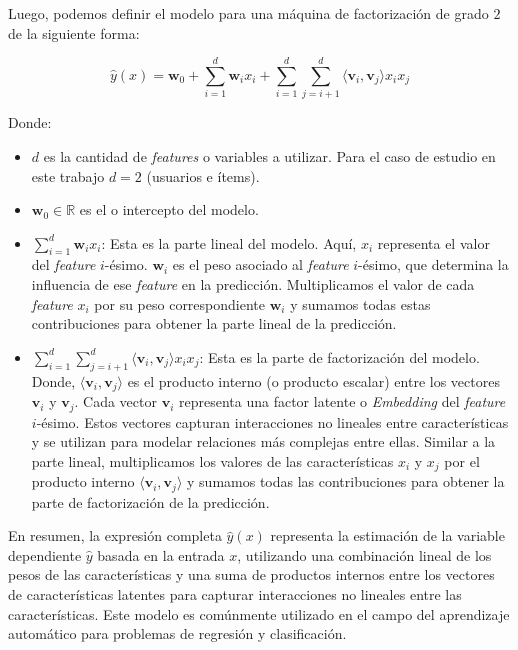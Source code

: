 \documentclass[11pt,a4paper,twoside]{thesis}
\begin{document}
Luego, podemos definir el modelo para una máquina de factorización de grado $2$
de la siguiente forma:

\begin{equation}
	\hat{y}(x) = \mathbf{w}_0 + \sum_{i=1}^d \mathbf{w}_i x_i + \sum_{i=1}^d\sum_{j=i+1}^d
	\langle\mathbf{v}_i, \mathbf{v}_j\rangle x_i x_j
\end{equation}
\begin{description}
	\item[Donde:]
\end{description}
\begin{itemize}
	\item $d$ es la cantidad de \textit{features} o variables a utilizar.
	      Para el caso de estudio en este trabajo $d=2$ (usuarios e ítems).
	\item $\mathbf{w}_0 \in \mathbb{R}$ es el  o intercepto del modelo.
	\item $\sum_{i=1}^d \mathbf{w}_i x_i$: Esta es la parte lineal del modelo. Aquí,
	      $x_i$ representa el valor del \textit{feature} $i$-ésimo. $\mathbf{w}_i$ es
	      el peso asociado al \textit{feature} $i$-ésimo, que determina la influencia
	      de ese \textit{feature} en la predicción. Multiplicamos el valor de cada
	      \textit{feature} $x_i$ por su peso correspondiente $\mathbf{w}_i$ y sumamos
	      todas estas contribuciones para obtener la parte lineal de la predicción.
	\item $\sum_{i=1}^d\sum_{j=i+1}^d \langle\mathbf{v}_i, \mathbf{v}_j\rangle x_i x_j$:
	      Esta es la parte de factorización del modelo. Donde, $\langle\mathbf{v}_i,
		      \mathbf{v}_j\rangle$ es el producto interno (o producto escalar) entre
	      los vectores $\mathbf{v}_i$ y $\mathbf{v}_j$. Cada vector $\mathbf{v}_i$
	      representa una factor latente o \textit{Embedding} del \textit{feature}
	      $i$-ésimo. Estos vectores capturan interacciones no lineales entre
	      características y se utilizan para modelar relaciones más complejas
	      entre ellas. Similar a la parte lineal, multiplicamos los valores
	      de las características $x_i$ y $x_j$ por el producto interno
	      $\langle\mathbf{v}_i, \mathbf{v}_j\rangle$ y sumamos todas las contribuciones
	      para obtener la parte de factorización de la predicción.

\end{itemize}

En resumen, la expresión completa $\hat{y}(x)$ representa la estimación de la
variable dependiente $\hat{y}$ basada en la entrada $x$, utilizando una
combinación lineal de los pesos de las características y una suma de productos
internos entre los vectores de características latentes para capturar
interacciones no lineales entre las características. Este modelo es comúnmente
utilizado en el campo del aprendizaje automático para problemas de regresión y
clasificación.
\end{document}
